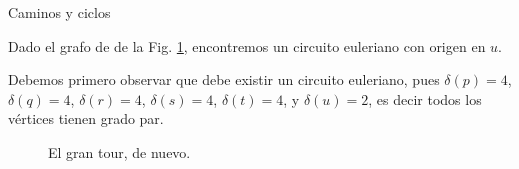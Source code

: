 \begin{section}{Caminos y ciclos}
\begin{comment}
    El recorrido formado de esta manera es un recorrido cerrado, pero puede no cubrir todos los vértices y aristas del grafo inicial.

    \item \textbf{Paso iterativo} Mientras exista un vértice $u$ en la caminata ya realizada, pero que tenga aristas que no formen parte de la caminata, inicie otra caminata desde $u$ hasta $u$ siguiendo las aristas no utilizadas. Luego,  inserte esta  caminata a la caminata  anterior para formar una caminata nueva (más larga).
    
    Observemos que el subgrafo formado por todas las aristas utilizadas despues de cada paso iterativo es un grafo con valencias pares y por lo tanto el subgrafo que obtenemos luego de quitar estas aristas también es par. Esto nos permite hacer caminatas cerradas  por aristas no utilizadas desde cada vértice con aristas no utilizadas.
\end{enumerate}

Puesto que suponemos que el grafo original es conexo, repetir el paso iterativo agotará todos las aristas del grafo.
\end{comment}

\begin{ejemplo*} Dado  el  grafo de de la  Fig. \ref{f5.7.1}, encontremos un circuito euleriano con origen en $u$. 

Debemos primero observar que  debe existir un circuito euleriano, pues $\delta(p)=4$, $\delta(q)=4$, $\delta(r)=4$, $\delta(s)=4$, $\delta(t)=4$, y $\delta(u)=2$,  es decir todos los vértices tienen grado par. 


\begin{figure}[ht]
    \begin{center}
    \end{center}
    \caption{El gran tour, de nuevo.} \label{f5.7.1}
\end{figure}


\end{ejemplo*}
\end{section}
